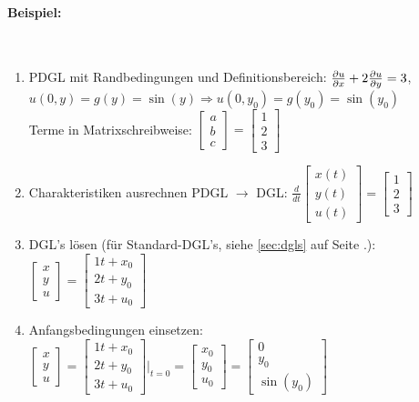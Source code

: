 \paragraph{Beispiel:}~\\
\begin{enumerate}
	\item PDGL mit Randbedingungen und Definitionsbereich: $\frac{\partial u}{\partial x}+2\frac{\partial u}{\partial y}=3$, \; $u(0,y)=g(y)=\sin(y) \Rightarrow u(0,y_0) = g(y_0) = \sin(y_0)$\\
	Terme in Matrixschreibweise: $\begin{bmatrix}a\\b\\c\end{bmatrix}=\begin{bmatrix}1\\2\\3\end{bmatrix}$
	\item Charakteristiken ausrechnen PDGL $\rightarrow$ DGL: 	$\frac {d}{dt}\begin{bmatrix}x(t)\\y(t)\\u(t)\end{bmatrix}=\begin{bmatrix}1\\2\\3\end{bmatrix}$
	\item DGL's lösen (für Standard-DGL's, siehe \ref{sec:dgls} auf Seite \pageref{sec:dgls}.): 
	$\begin{bmatrix}x\\y\\u\end{bmatrix}=\begin{bmatrix}1t+x_0\\2t+y_0\\3t+u_0\end{bmatrix}$
	\item Anfangsbedingungen einsetzen: $\begin{bmatrix}x\\y\\u\end{bmatrix}=\begin{bmatrix}1t+x_0\\2t+y_0\\3t+u_0\end{bmatrix}\Bigg|_{t=0}=
	\begin{bmatrix}x_0\\y_0\\u_0\end{bmatrix}=\begin{bmatrix}0\\y_0\\\sin(y_0)\end{bmatrix}$\\

\end{enumerate}
